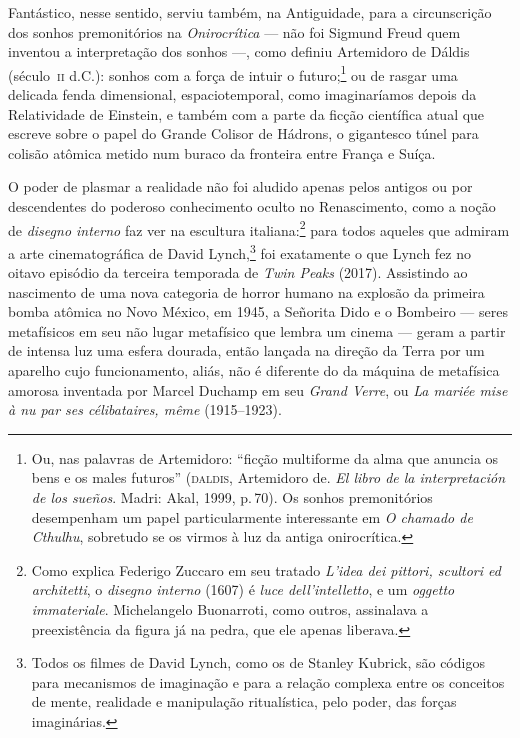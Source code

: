 Fantástico, nesse sentido, serviu também, na Antiguidade, para a
circunscrição dos sonhos premonitórios na \emph{Onirocrítica} --- não
foi Sigmund Freud quem inventou a interpretação dos sonhos ---, como
definiu Artemidoro de Dáldis (século~\textsc{ii} d.C.): sonhos com a força de
intuir o futuro;\footnote{Ou, nas palavras de Artemidoro: ``ficção
  multiforme da alma que anuncia os bens e os males futuros''
  (\textsc{daldis}, Artemidoro de. \emph{El libro de la interpretación
  de los sueños}. Madri: Akal, 1999, p.\,70). Os sonhos premonitórios
  desempenham um papel particularmente interessante em \emph{O chamado de
    Cthulhu}, sobretudo se os virmos à luz da antiga onirocrítica.} ou
de rasgar uma delicada fenda dimensional, espaciotemporal, como
imaginaríamos depois da Relatividade de Einstein, e também com a parte
da ficção científica atual que escreve sobre o papel do Grande Colisor
de Hádrons, o gigantesco túnel para colisão atômica metido num buraco da
fronteira entre França e Suíça.

O poder de plasmar a realidade não foi aludido apenas pelos antigos ou
por descendentes do poderoso conhecimento oculto no Renascimento, como a
noção de \emph{disegno interno} faz ver na escultura italiana:\footnote{Como
  explica Federigo Zuccaro em seu tratado \emph{L'idea dei
  pittori, scultori ed architetti}, o \emph{disegno interno} (1607) é
  \emph{luce dell'intelletto}, e um \emph{oggetto immateriale}.
  Michelangelo Buonarroti, como outros, assinalava a
  preexistência da figura já na pedra, que ele apenas liberava.} para
todos aqueles que admiram a arte cinematográfica de David
Lynch,\footnote{Todos os filmes de David Lynch, como os de Stanley
  Kubrick, são códigos para mecanismos de imaginação e para a relação
  complexa entre os conceitos de mente, realidade e manipulação
  ritualística, pelo poder, das forças imaginárias.} foi exatamente o
que Lynch fez no oitavo episódio da terceira temporada de
\emph{Twin Peaks} (2017). Assistindo ao nascimento de uma nova categoria
de horror humano na explosão da primeira bomba atômica no Novo México,
em 1945, a Señorita Dido e o Bombeiro --- seres metafísicos em seu
não lugar metafísico que lembra um cinema --- geram a partir de intensa
luz uma esfera dourada, então lançada na direção da Terra por um
aparelho cujo funcionamento, aliás, não é diferente do da máquina de
metafísica amorosa inventada por Marcel Duchamp em seu \emph{Grand
Verre}, ou \emph{La mariée mise à nu par ses célibataires, même}
(1915--1923).

